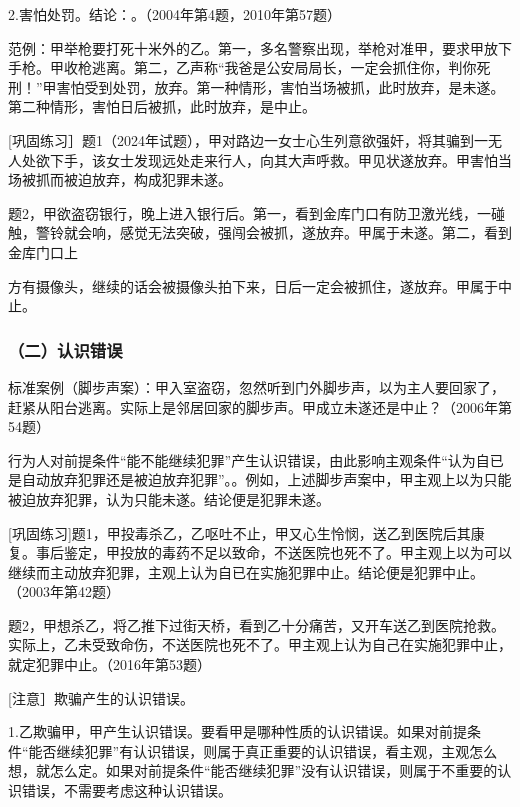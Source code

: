 2.害怕处罚。结论：。（2004年第4题，2010年第57题）

范例：甲举枪要打死十米外的乙。第一，多名警察出现，举枪对准甲，要求甲放下手枪。甲收枪逃离。第二，乙声称“我爸是公安局局长，一定会抓住你，判你死刑！”甲害怕受到处罚，放弃。第一种情形，害怕当场被抓，此时放弃，是未遂。第二种情形，害怕日后被抓，此时放弃，是中止。

[巩固练习］题1（2024年试题），甲对路边一女士心生列意欲强奸，将其骗到一无人处欲下手，该女士发现远处走来行人，向其大声呼救。甲见状遂放弃。甲害怕当场被抓而被迫放弃，构成犯罪未遂。

题2，甲欲盗窃银行，晚上进入银行后。第一，看到金库门口有防卫激光线，一碰触，警铃就会响，感觉无法突破，强闯会被抓，遂放弃。甲属于未遂。第二，看到金库门口上

方有摄像头，继续的话会被摄像头拍下来，日后一定会被抓住，遂放弃。甲属于中止。

\subsubsection*{（二）认识错误}

标准案例（脚步声案）：甲入室盗窃，忽然听到门外脚步声，以为主人要回家了，赶紧从阳台逃离。实际上是邻居回家的脚步声。甲成立未遂还是中止？（2006年第54题）

行为人对前提条件“能不能继续犯罪”产生认识错误，由此影响主观条件“认为自已是自动放弃犯罪还是被迫放弃犯罪”。。例如，上述脚步声案中，甲主观上以为只能被迫放弃犯罪，认为只能未遂。结论便是犯罪未遂。

[巩固练习]题1，甲投毒杀乙，乙呕吐不止，甲又心生怜悯，送乙到医院后其康复。事后鉴定，甲投放的毒药不足以致命，不送医院也死不了。甲主观上以为可以继续而主动放弃犯罪，主观上认为自已在实施犯罪中止。结论便是犯罪中止。（2003年第42题）

题2，甲想杀乙，将乙推下过街天桥，看到乙十分痛苦，又开车送乙到医院抢救。实际上，乙未受致命伤，不送医院也死不了。甲主观上认为自己在实施犯罪中止，就定犯罪中止。（2016年第53题）

[注意］欺骗产生的认识错误。

1.乙欺骗甲，甲产生认识错误。要看甲是哪种性质的认识错误。如果对前提条件“能否继续犯罪”有认识错误，则属于真正重要的认识错误，看主观，主观怎么想，就怎么定。如果对前提条件“能否继续犯罪”没有认识错误，则属于不重要的认识错误，不需要考虑这种认识错误。

